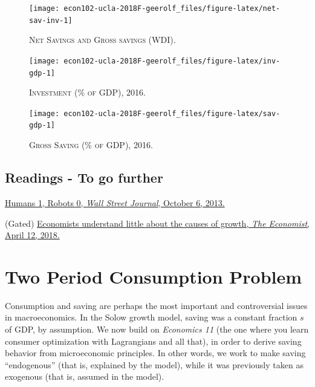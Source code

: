 \documentclass[]{book}
\theoremstyle{definition}
\theoremstyle{definition}
\theoremstyle{definition}
\theoremstyle{remark}
\begin{document}
\begin{figure}

{\centering \texttt{[image: econ102-ucla-2018F-geerolf\_files/figure-latex/net-sav-inv-1]} 

}

\caption{\textsc{Net Savings and Gross savings (WDI)}.}\label{fig:net-sav-inv}
\end{figure}



\begin{figure}

{\centering \texttt{[image: econ102-ucla-2018F-geerolf\_files/figure-latex/inv-gdp-1]} 

}

\caption{\textsc{Investment (\% of GDP), 2016}.}\label{fig:inv-gdp}
\end{figure}



\begin{figure}

{\centering \texttt{[image: econ102-ucla-2018F-geerolf\_files/figure-latex/sav-gdp-1]} 

}

\caption{\textsc{Gross Saving (\% of GDP), 2016}.}\label{fig:sav-gdp}
\end{figure}

\section*{Readings - To go further}\label{readings---to-go-further-1}

\href{https://www.wsj.com/articles/humans-1-robots-0-1381098947?tesla=y}{Humans
1, Robots 0, \emph{Wall Street Journal}, October 6, 2013.}

(Gated)
\href{https://www.economist.com/finance-and-economics/2018/04/12/economists-understand-little-about-the-causes-of-growth}{Economists
understand little about the causes of growth, \emph{The Economist},
April 12, 2018.}

\hypertarget{two-period}{\chapter{Two Period Consumption
Problem}\label{two-period}}

Consumption and saving are perhaps the most important and controversial
issues in macroeconomics. In the Solow growth model, saving was a
constant fraction \(s\) of GDP, by assumption. We now build on
\emph{Economics 11} (the one where you learn consumer optimization with
Lagrangians and all that), in order to derive saving behavior from
microeconomic principles. In other words, we work to make saving
``endogenous'' (that is, explained by the model), while it was
previously taken as exogenous (that is, assumed in the model).
\end{document}
